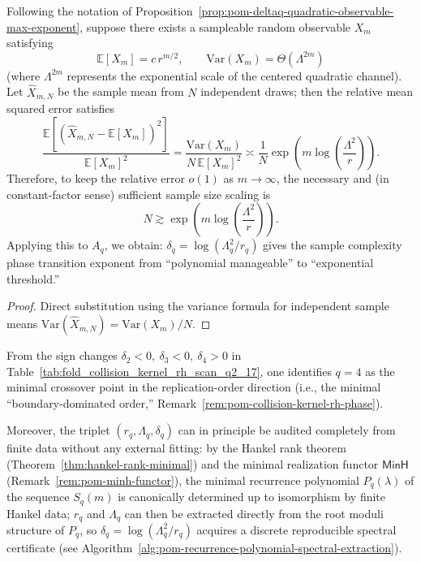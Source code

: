 \begin{corollary}\label{cor:pom-deltaq-sample-complexity-threshold}
Following the notation of Proposition~\ref{prop:pom-deltaq-quadratic-observable-max-exponent}, suppose there exists a sampleable random observable \(X_m\) satisfying
\[
\mathbb E[X_m]=c\,r^{m/2},\qquad \mathrm{Var}(X_m)=\Theta(\Lambda^{2m})
\]
(where \(\Lambda^{2m}\) represents the exponential scale of the centered quadratic channel).
Let \(\widehat X_{m,N}\) be the sample mean from \(N\) independent draws; then the relative mean squared error satisfies
\[
\frac{\mathbb E[(\widehat X_{m,N}-\mathbb E[X_m])^2]}{\mathbb E[X_m]^2}
=\frac{\mathrm{Var}(X_m)}{N\,\mathbb E[X_m]^2}
\asymp
\frac{1}{N}\exp\!\left(m\log\!\left(\frac{\Lambda^2}{r}\right)\right).
\]
Therefore, to keep the relative error \(o(1)\) as \(m\to\infty\), the necessary and (in constant-factor sense) sufficient sample size scaling is
\[
N\gtrsim \exp\!\left(m\log\!\left(\frac{\Lambda^2}{r}\right)\right).
\]
Applying this to \(A_q\), we obtain: \(\delta_q=\log(\Lambda_q^2/r_q)\) gives the sample complexity phase transition exponent from ``polynomial manageable'' to ``exponential threshold.''
\end{corollary}
\begin{proof}
Direct substitution using the variance formula for independent sample means
\(
\mathrm{Var}(\widehat X_{m,N})=\mathrm{Var}(X_m)/N
\).
\end{proof}

\begin{remark}\label{rem:pom-deltaq-minimal-visible-order-auditability}
From the sign changes
\(
\delta_2<0,\ \delta_3<0,\ \delta_4>0
\)
in Table~\ref{tab:fold_collision_kernel_rh_scan_q2_17}, one identifies \(q=4\) as the minimal crossover point in the replication-order direction (i.e., the minimal ``boundary-dominated order,'' Remark~\ref{rem:pom-collision-kernel-rh-phase}).
\par
Moreover, the triplet \((r_q,\Lambda_q,\delta_q)\) can in principle be audited completely from finite data without any external fitting: by the Hankel rank theorem (Theorem~\ref{thm:hankel-rank-minimal}) and the minimal realization functor \(\mathsf{MinH}\) (Remark~\ref{rem:pom-minh-functor}), the minimal recurrence polynomial \(P_q(\lambda)\) of the sequence \(S_q(m)\) is canonically determined up to isomorphism by finite Hankel data; \(r_q\) and \(\Lambda_q\) can then be extracted directly from the root moduli structure of \(P_q\), so \(\delta_q=\log(\Lambda_q^2/r_q)\) acquires a discrete reproducible spectral certificate (see Algorithm~\ref{alg:pom-recurrence-polynomial-spectral-extraction}).
\end{remark}



